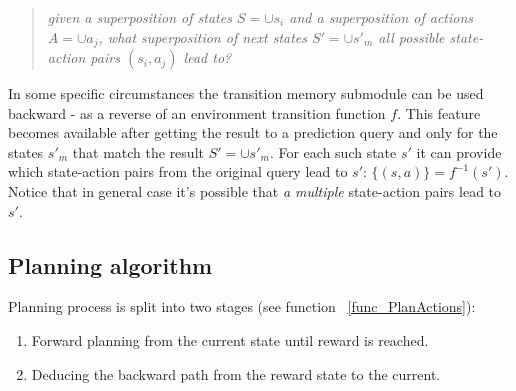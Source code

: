 \documentclass[runningheads]{llncs}
\begin{document}
\begin{quote}
  \textit{given a superposition \footnotemark of states $S = \cup s_i$ and a superposition of actions $A = \cup a_j$, what superposition of next states $S'= \cup s'_m$ all possible state-action pairs $(s_i, a_j)$ lead to?}
\end{quote}



In some specific circumstances the transition memory submodule can be used backward - as a reverse of an environment transition function $f$. This feature becomes available after getting the result to a prediction query and only for the states $s'_m$ that match the result $S' = \cup s'_m$. For each such state $s'$ it can provide which state-action pairs from the original query lead to $s'$: $\{(s, a)\} = f^{-1}(s')$. Notice that in general case it's possible that \textit{a multiple} state-action pairs lead to $s'$.

\subsection{Planning algorithm}

Planning process is split into two stages (see function ~\ref{func_PlanActions}):

\begin{enumerate}
  \item Forward planning from the current state until reward is reached.
  \item Deducing the backward path from the reward state to the current.
\end{enumerate}
\end{document}
